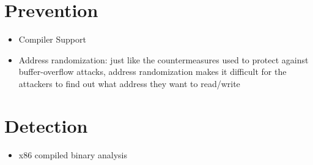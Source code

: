 \documentclass[11pt]{article}
\begin{document}
\section{Prevention}
\label{sec:orgcc44a07}

\begin{itemize}
\item Compiler Support
\end{itemize}
\begin{itemize}
\item Address randomization:  just like the countermeasures used to protect
against buffer-overflow attacks, address randomization makes it
difficult for the attackers to find out what address they want to read/write
\end{itemize}

\section{Detection}
\label{sec:orge26ed67}

\begin{itemize}
\item x86 compiled binary analysis
\end{itemize}
\end{document}
